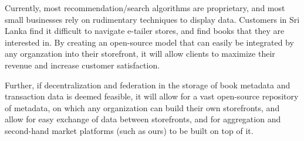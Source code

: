   Currently, most recommendation/search algorithms are proprietary, and most small
  businesses rely on rudimentary techniques to display data. Customers in Sri Lanka
  find it difficult to navigate e-tailer stores, and find books that they are interested
  in. By creating an open-source model that can easily be integrated by any organzation
  into their storefront, it will allow clients to maximize their revenue and increase
  customer satisfaction.

  Further, if decentralization and federation in the storage of book metadata and transaction
  data is deemed feasible, it will allow for a vast open-source repository of metadata, on
  which any organization can build their own storefronts, and allow for easy exchange of
  data between storefronts, and for aggregation and second-hand market platforms (such as ours)
  to be built on top of it.